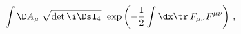 \begin{equation}
  \int {\D}A_\mu \; \sqrt{\det \i \Dsl_4}\;\, \exp \left( -
  \frac{1}{2} \int \dx \tr\, F_{\mu\nu} F^{\mu\nu} \right)\,,
\label{pathint}
\end{equation}

